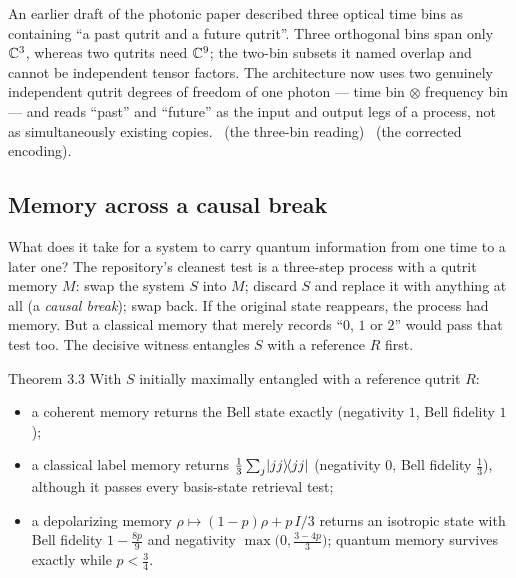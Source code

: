 \begin{boundary}
An earlier draft of the photonic paper described three optical time bins as containing
``a past qutrit and a future qutrit''. Three orthogonal bins span only $\mathbb{C}^3$, whereas two
qutrits need $\mathbb{C}^9$; the two-bin subsets it named overlap and cannot be independent tensor
factors. The architecture now uses two genuinely independent qutrit degrees of freedom
of one photon --- time bin $\otimes$ frequency bin --- and reads ``past'' and ``future''
as the input and output legs of a process, not as simultaneously existing copies.
\tierX\ (the three-bin reading) \quad \tierT\ (the corrected encoding).
\end{boundary}

\subsection{Memory across a causal break}

What does it take for a system to carry quantum information from one time to a later
one? The repository's cleanest test is a three-step process with a qutrit memory $M$:
swap the system $S$ into $M$; discard $S$ and replace it with anything at all (a
\emph{causal break}); swap back. If the original state reappears, the process had
memory. But a classical memory that merely records ``$0$, $1$ or $2$'' would pass that
test too. The decisive witness entangles $S$ with a reference $R$ first.

\begin{result}{Theorem 3.3 \hfill \tierC}
With $S$ initially maximally entangled with a reference qutrit $R$:
\begin{itemize}
\item a coherent memory returns the Bell state exactly (negativity $1$, Bell fidelity $1$);
\item a classical label memory returns $\tfrac13\sum_j\lvert jj\rangle\!\langle jj\rvert$ (negativity $0$,
      Bell fidelity $\tfrac13$), although it passes every basis-state retrieval test;
\item a depolarizing memory $\rho\mapsto(1-p)\rho+p\,I/3$ returns an isotropic state with
      Bell fidelity $1-\tfrac{8p}{9}$ and negativity $\max\bigl(0,\tfrac{3-4p}{3}\bigr)$;
      quantum memory survives exactly while $p<\tfrac34$.
\end{itemize}
\end{result}

